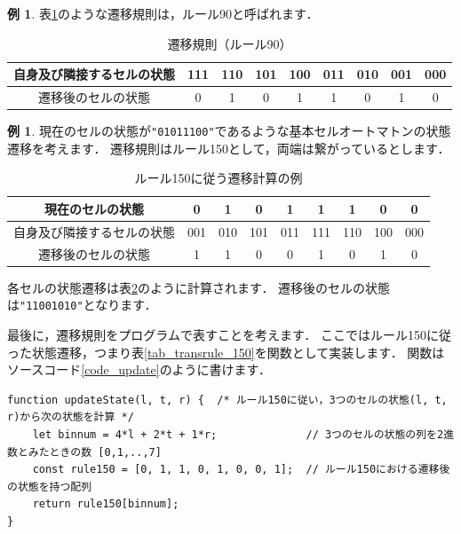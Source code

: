 \documentclass[dvipdfmx]{jsarticle}
\theoremstyle{definition}
\newtheorem{example}[definition]{例}
\begin{document}
\begin{example}
    \label{ex_transrule}
    表\ref{tab_transrule_90}のような遷移規則は，ルール90と呼ばれます．
    \begin{table}[H]
        \caption{遷移規則（ルール90）}
        \label{tab_transrule_90}
        \centering
        \begin{tabular}{|c||c|c|c|c|c|c|c|c|} \hline
            自身及び隣接するセルの状態 & 111 & 110 & 101 & 100 & 011 & 010 & 001 & 000 \\ \hline
            遷移後のセルの状態      &  0   &  1  &  0  &  1  &  1  &  0  &  1  &  0 \\ \hline
        \end{tabular}
    \end{table}
\end{example}

\begin{example}
    \label{ex_update_gen}
    現在のセルの状態が\verb|"01011100"|であるような基本セルオートマトンの状態遷移を考えます．
    遷移規則はルール150として，両端は繋がっているとします．
    \begin{table}[H]
        \caption{ルール150に従う遷移計算の例}
        \label{tab_ex_update_gen}
        \centering
        \begin{tabular}{|c||c|c|c|c|c|c|c|c|} \hline
            現在のセルの状態 & 0 & 1 & 0 & 1 & 1 & 1 & 0 & 0 \\ \hline
            自身及び隣接するセルの状態 & 001 & 010 & 101 & 011 & 111 & 110 & 100 & 000 \\ \hline
            遷移後のセルの状態 & 1 & 1 & 0 & 0 & 1 & 0 & 1 & 0 \\ \hline
        \end{tabular}
    \end{table}
    各セルの状態遷移は表\ref{tab_ex_update_gen}のように計算されます．
    遷移後のセルの状態は\verb|"11001010"|となります．
\end{example}

最後に，遷移規則をプログラムで表すことを考えます．
ここではルール150に従った状態遷移，つまり表\ref{tab_transrule_150}を関数として実装します．
関数はソースコード\ref{code_update}のように書けます．

\begin{lstlisting}[caption=ルール150に基づく遷移を計算する関数, label=code_update]
function updateState(l, t, r) {  /* ルール150に従い，3つのセルの状態(l, t, r)から次の状態を計算 */
    let binnum = 4*l + 2*t + 1*r;              // 3つのセルの状態の列を2進数とみたときの数 [0,1,..,7]
    const rule150 = [0, 1, 1, 0, 1, 0, 0, 1];  // ルール150における遷移後の状態を持つ配列
    return rule150[binnum];
}
\end{lstlisting}
\end{document}
